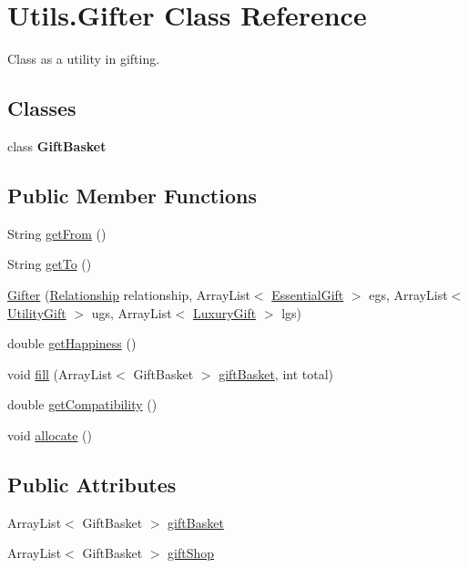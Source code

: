 \hypertarget{class_utils_1_1_gifter}{}\section{Utils.\+Gifter Class Reference}
\label{class_utils_1_1_gifter}


Class as a utility in gifting.  


\subsection*{Classes}
\begin{DoxyCompactItemize}
\item 
class {\bfseries Gift\+Basket}
\end{DoxyCompactItemize}
\subsection*{Public Member Functions}
\begin{DoxyCompactItemize}
\item 
String \hyperlink{class_utils_1_1_gifter_a9ef6e6d57b4ab1716af2ba8cd43fdd2d}{get\+From} ()
\item 
String \hyperlink{class_utils_1_1_gifter_a87a74e04ad51fa6b4daaeb95a3cacdf1}{get\+To} ()
\item 
\hyperlink{class_utils_1_1_gifter_a984afd4a0df402d995a65ba0a488db42}{Gifter} (\hyperlink{class_utils_1_1_relationship}{Relationship} relationship, Array\+List$<$ \hyperlink{class_gifts_1_1_essential_gift}{Essential\+Gift} $>$ egs, Array\+List$<$ \hyperlink{class_gifts_1_1_utility_gift}{Utility\+Gift} $>$ ugs, Array\+List$<$ \hyperlink{class_gifts_1_1_luxury_gift}{Luxury\+Gift} $>$ lgs)
\item 
double \hyperlink{class_utils_1_1_gifter_a225a7aad5c80f5ed994433019deb2ec8}{get\+Happiness} ()
\item 
void \hyperlink{class_utils_1_1_gifter_a09eb10604af7b853228c06ba4e38c62c}{fill} (Array\+List$<$ Gift\+Basket $>$ \hyperlink{class_utils_1_1_gifter_a84e80a45026df5d08aefda2591823504}{gift\+Basket}, int total)
\item 
double \hyperlink{class_utils_1_1_gifter_afa636f239d83decb0f64aa20d19fc847}{get\+Compatibility} ()
\item 
void \hyperlink{class_utils_1_1_gifter_ae500c74a00252fadff550c52d4dda5df}{allocate} ()
\end{DoxyCompactItemize}
\subsection*{Public Attributes}
\begin{DoxyCompactItemize}
\item 
Array\+List$<$ Gift\+Basket $>$ \hyperlink{class_utils_1_1_gifter_a84e80a45026df5d08aefda2591823504}{gift\+Basket}
\item 
Array\+List$<$ Gift\+Basket $>$ \hyperlink{class_utils_1_1_gifter_aa187a1420fc0e9574e2281622d544091}{gift\+Shop}
\end{DoxyCompactItemize}


